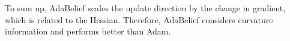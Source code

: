 \documentclass{article}
\begin{document}
To sum up, AdaBelief scales the update direction by the change in gradient, which is related to the Hessian. Therefore, AdaBelief considers curvature information and performs better than Adam.
\end{document}
